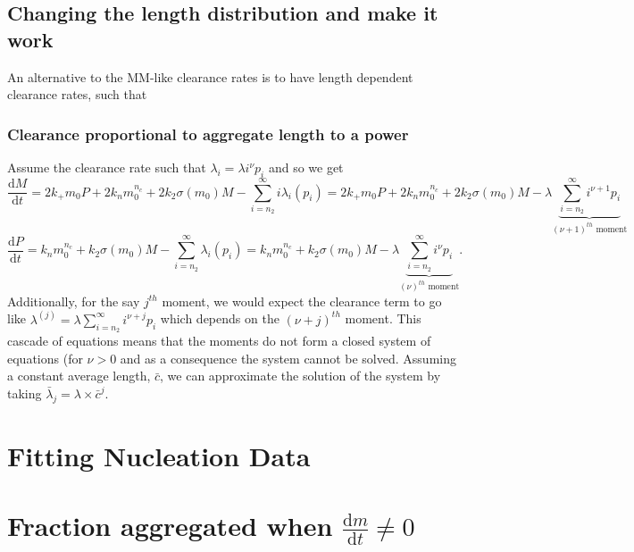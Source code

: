 \subsection{Changing the length distribution and make it work}

An alternative to the MM-like clearance rates is to have length dependent clearance rates, such that 


\subsubsection{Clearance proportional to aggregate length to a power}
Assume the clearance rate such that $\lambda_i=\lambda i^{\nu} p_i$ and so we get
\begin{equation}
    \frac{\text{d}M}{\text{d}t} = 2 k_+m_0 P+2k_n m_0^{n_c}+2k_2\sigma(m_0)M-\sum_{i=n_2}^{\infty}i\lambda_i (p_i) = 2 k_+m_0 P+2k_n m_0^{n_c}+2k_2\sigma(m_0)M-\lambda \underbrace{\sum_{i=n_2}^{\infty} i^{\nu+1} p_i}_{(\nu+1)^{th} \text{ moment}}
\end{equation}
\begin{equation}
    \frac{\text{d}P}{\text{d}t} = k_n m_0^{n_c}+k_2\sigma(m_0)M-\sum_{i=n_2}^{\infty}\lambda_i (p_i) = k_n m_0^{n_c}+k_2\sigma(m_0)M-\lambda \underbrace{\sum_{i=n_2}^{\infty} i^{\nu} p_i}_{(\nu)^{th} \text{ moment}}.
\end{equation}
Additionally, for the say $j^{th}$ moment, we would expect the clearance term to go like $\lambda^{(j)} = \lambda \sum_{i=n_2}^{\infty} i^{\nu+j} p_i$ which depends on the $(\nu+j)^{th}$ moment. This cascade of equations means that the moments do not form a closed system of equations (for $\nu>0$ and as a consequence the system cannot be solved. Assuming a constant average length, $\bar{c}$, we can approximate the solution of the system by taking $\bar{\lambda}_{j}=\lambda\times \bar{c}^{j}$.

\section{Fitting Nucleation Data}
\section{Fraction aggregated when $\frac{\text{d}m}{\text{d}t} \neq 0$}

